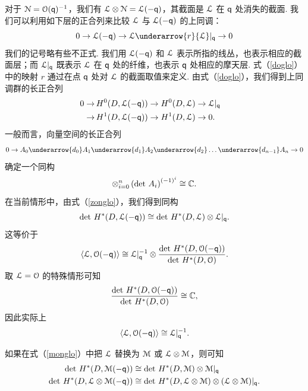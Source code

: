 对于 ${\cal N}={\cal O}(\qq)^{-1}$，我们有 ${\cal L}\otimes {\cal
N}={\cal L}(-\qq)$，其截面是 ${\cal L}$ 在 $\qq$ 处消失的截面. 我们可以利用如下层的正合列来比较 ${\cal L}$ 与 ${\cal L}(-\qq)$ 的上同调：
\begin{equation}\label{doglo}
0\to {\cal L}(-\qq)\to {\cal L}\underarrow{r} {\cal L}|_\qq\to 0
\end{equation}
我们的记号略有些不正式. 我们用 ${\cal L}(-\qq)$ 和 ${\cal L}$ 表示所指的线丛，也表示相应的截面层；而 ${\cal L}|_\qq$ 既表示 ${\cal L}$ 在 $\qq$ 处的纤维，也表示 $\qq$ 处相应的摩天层. 式（\ref{doglo}）中的映射 $r$ 通过在点 $\qq$ 处对 ${\cal L}$ 的截面取值来定义. 由式（\ref{doglo}），我们得到上同调群的长正合列
\begin{align}\label{zonglo}
 0\to & \,H^0(D,{\cal L}(-\qq))\to H^0(D,{\cal L})\to {\cal L}|_\qq \cr
 \to&\,
 H^1(D,{\cal L}(-\qq))\to H^1(D,{\cal L})\to 0.\end{align}
一般而言，向量空间的长正合列
\begin{equation}\label{onglo}
0\to A_0\underarrow{d_0}
A_1\underarrow{d_1}A_2\underarrow{d_2}\dots
\underarrow{d_{n-1}}A_n\to 0  \end{equation} 确定一个同构
\begin{equation}\label{ponglo}
\otimes_{i=0}^n \left(\det\,
A_i\right)^{(-1)^i}\cong\Bbb{C}.\end{equation} 在当前情形中，由式（\ref{zonglo}），我们得到同构
\begin{equation}\label{monglo}
\det\,H^*(D,{\cal L}(-\qq))\cong \det\,H^*(D,{\cal L})\otimes {\cal
L}|_\qq.\end{equation} 这等价于
\begin{equation}\label{kongo}
\langle{\cal L},{\cal O}(-\qq)\rangle \cong{\cal L}|_\qq^{-1}\otimes
{\det\,H^*(D,{\cal O}(-\qq))\over \det\,H^*(D,{\cal
O})}.\end{equation} 取 ${\cal L}={\cal O}$ 的特殊情形可知
\begin{equation}\label{ubongo}{\det\,H^*(D,{\cal O}(-\qq))\over \det\,H^*(D,{\cal O})}
\cong{\Bbb{C}},
\end{equation}
因此实际上
\begin{equation}\label{rongo} \langle{\cal L},{\cal O}(-\qq)\rangle\cong {\cal L}|_\qq^{-1}.
\end{equation}

如果在式（\ref{monglo}）中把 ${\cal L}$ 替换为 ${\cal M}$ 或 ${\cal L}\otimes {\cal M}$，则可知
\begin{align}\label{moonglo}
\det\,H^*(D,{\cal M}(-\qq))&\cong \det\,H^*(D,{\cal M})\otimes {\cal
M}|_\qq\\ \nonumber \det\,H^*(D,{\cal L}\otimes {\cal M}(-\qq))&\cong
\det\,H^*(D,{\cal L}\otimes{\cal M})\otimes ({\cal L}\otimes {\cal
M})|_\qq.
\end{align}


